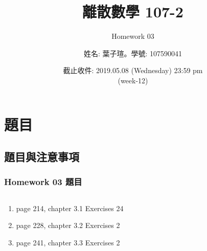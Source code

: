 \documentclass[14pt,hyperref={bookmarks=false}]{beamer}
\title{離散數學 107-2}
\subtitle{Homework 03}
\author{姓名: 葉子瑄。學號: 107590041}
\date{截止收件: 2019.05.08 (Wednesday) 23:59 pm \\ (week-12)}
\begin{document}

\begin{frame}
\titlepage
\end{frame}

\raggedright

\begin{frame}
\footnotesize
\tableofcontents
\end{frame}
	
\section{題目}

	\subsection{題目與注意事項}
	
	\begin{frame}
	\frametitle{Homework 03 題目}
	\fontsize{8pt}{9pt}\selectfont
	\setlength{\baselineskip}{5pt}
	\begin{columns}
	\begin{column}{0.68\textwidth}
	\begin{enumerate}[label=(Prob. \arabic*)]
	\setlength\itemsep{0em}
	\item page 214, chapter 3.1 Exercises 24
	\item page 228, chapter 3.2 Exercises 2
	\item page 241, chapter 3.3 Exercises 2
	\end{enumerate}
	\end{column}
	
	
	\end{columns}
	\end{frame}
	
\end{document}
